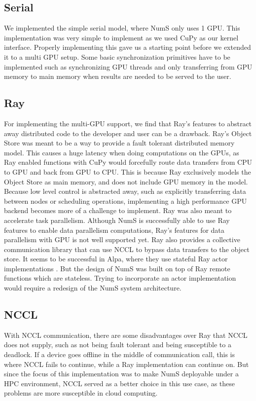 \documentclass{article}
\begin{document}
\subsection{Serial}
We implemented the simple serial model, where NumS only uses 1 GPU. This implementation was very simple to implement as we used CuPy as our kernel interface. Properly implementing this gave us a starting point before we extended it to a multi GPU setup. Some basic synchronization primitives have to be implemented such as synchronizing GPU threads and only transferring from GPU memory to main memory when results are needed to be served to the user.

\subsection{Ray}
For implementing the multi-GPU support, we find that Ray's features to abstract away distributed code to the developer and user can be a drawback. Ray's Object Store was meant to be a way to provide a fault tolerant distributed memory model. \cite{ray} This causes a huge latency when doing computations on the GPUs, as Ray enabled functions with CuPy would forcefully route data transfers from CPU to GPU and back from GPU to CPU. This is because Ray exclusively models the Object Store as main memory, and does not include GPU memory in the model. Because low level control is abstracted away, such as explicitly transferring data between nodes or scheduling operations, implementing a high performance GPU backend becomes more of a challenge to implement. Ray was also meant to accelerate task parallelism. Although NumS is successfully able to use Ray features to enable data parallelism computations, Ray's features for data parallelism with GPU is not well supported yet. Ray also provides a collective communication library that can use NCCL to bypass data transfers to the object store. It seems to be successful in Alpa, where they use stateful Ray actor implementations \cite{alpa}. But the design of NumS was built on top of Ray remote functions which are stateless. Trying to incorporate an actor implementation would require a redesign of the NumS system architecture. 

\subsection{NCCL}
With NCCL communication, there are some disadvantages over Ray that NCCL does not supply, such as not being fault tolerant and being susceptible to a deadlock. If a device goes offline in the middle of communication call, this is where NCCL fails to continue, while a Ray implementation can continue on. But since the focus of this implementation was to make NumS deployable under a HPC environment, NCCL served as a better choice in this use case, as these problems are more susceptible in cloud computing. 
\end{document}
